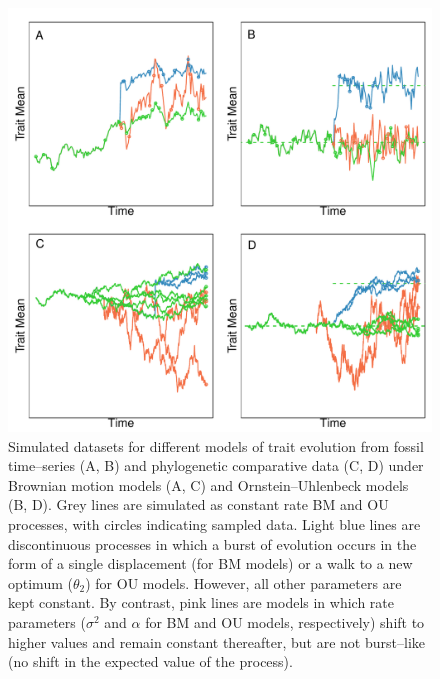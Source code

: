 \begin{figure}[p]
\centering
\includegraphics[width=\textwidth]{figs/Pennell_TREE-fig-box1}
\caption[Trait data simulated under alternative models]{Simulated datasets for different models of trait evolution from fossil time--series (A, B) and phylogenetic comparative data (C, D) under Brownian motion models (A, C) and Ornstein--Uhlenbeck models (B, D). Grey lines are simulated as constant rate BM and OU processes, with circles indicating sampled data. Light blue lines are discontinuous processes in which a burst of evolution occurs in the form of a single displacement (for BM models) or a walk to a new optimum ($\theta_2$) for OU models. However, all other parameters are kept constant. By contrast, pink lines are models in which rate parameters ($\sigma^2$ and $\alpha$ for BM and OU models, respectively) shift to higher values and remain constant thereafter, but are not burst--like (no shift in the expected value of the process).  
}
\label{fig:pe-box1}
\end{figure}


